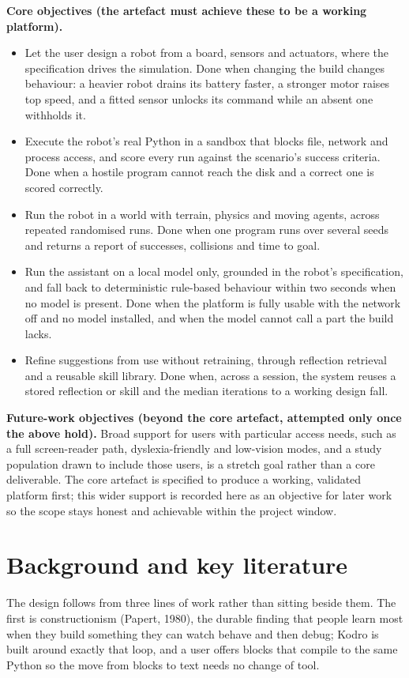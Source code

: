 \documentclass[10.5pt]{article}
\begin{document}
\textbf{Core objectives (the artefact must achieve these to be a working platform).}
\begin{itemize}
\item Let the user design a robot from a board, sensors and actuators, where the specification drives the simulation. Done when changing the build changes behaviour: a heavier robot drains its battery faster, a stronger motor raises top speed, and a fitted sensor unlocks its command while an absent one withholds it.
\item Execute the robot's real Python in a sandbox that blocks file, network and process access, and score every run against the scenario's success criteria. Done when a hostile program cannot reach the disk and a correct one is scored correctly.
\item Run the robot in a world with terrain, physics and moving agents, across repeated randomised runs. Done when one program runs over several seeds and returns a report of successes, collisions and time to goal.
\item Run the assistant on a local model only, grounded in the robot's specification, and fall back to deterministic rule-based behaviour within two seconds when no model is present. Done when the platform is fully usable with the network off and no model installed, and when the model cannot call a part the build lacks.
\item Refine suggestions from use without retraining, through reflection retrieval and a reusable skill library. Done when, across a session, the system reuses a stored reflection or skill and the median iterations to a working design fall.
\end{itemize}

\textbf{Future-work objectives (beyond the core artefact, attempted only once the above hold).} Broad support for users with particular access needs, such as a full screen-reader path, dyslexia-friendly and low-vision modes, and a study population drawn to include those users, is a stretch goal rather than a core deliverable. The core artefact is specified to produce a working, validated platform first; this wider support is recorded here as an objective for later work so the scope stays honest and achievable within the project window.

\section{Background and key literature}
The design follows from three lines of work rather than sitting beside them. The first is constructionism (Papert, 1980), the durable finding that people learn most when they build something they can watch behave and then debug; Kodro is built around exactly that loop, and a user offers blocks that compile to the same Python so the move from blocks to text needs no change of tool.
\end{document}
